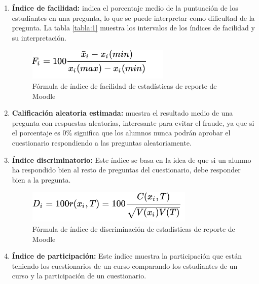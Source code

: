 \begin{enumerate}
    \item \textbf{Índice de facilidad:} indica el porcentaje medio de la puntuación de los estudiantes en una pregunta, lo que se puede interpretar como dificultad de la pregunta. La tabla \ref{tabla:1} muestra los intervalos de los índices de facilidad y su interpretación.
    \begin{figure}[H]
        \centering
        \includegraphics[width=0.7\linewidth]{img/formula-indice-facilidad.png}
        \caption{Fórmula de índice de facilidad de estadísticas de reporte de Moodle}
        \label{fig:formula-indice-facilidad}
    \end{figure}
    \item \textbf{Calificación aleatoria estimada:} muestra el resultado medio de una pregunta con respuestas aleatorias, interesante para evitar el fraude, ya que si el porcentaje es 0\% significa que los alumnos nunca podrán aprobar el cuestionario respondiendo a las preguntas aleatoriamente.
    
    \item \textbf{Índice discriminatorio:} Este índice se basa en la idea de que si un alumno ha respondido bien al resto de preguntas del cuestionario, debe responder bien a la pregunta.

    \begin{figure}[H]
        \centering
        \includegraphics[width=0.70\linewidth]{img/formula-indice-discriminacion.png}
        \caption{Fórmula de índice de discriminación de estadísticas de reporte de Moodle}
        \label{fig:formula-indice-discriminacion}
    \end{figure}
    
    \item \textbf{Índice de participación:} Este índice muestra la participación que están teniendo los cuestionarios de un curso comparando los estudiantes de un curso y la participación de un cuestionario.
\end{enumerate}

